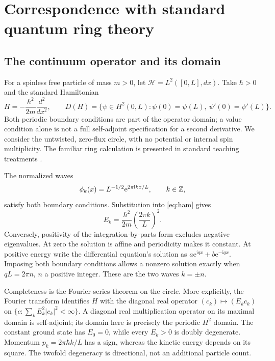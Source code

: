 \documentclass[11pt,a4paper]{article}
\theoremstyle{definition}\newtheorem{definition}[theorem]{Definition}
\theoremstyle{remark}\newtheorem{remark}[theorem]{Remark}
\newcommand{\ee}{\mathrm e}\newcommand{\ii}{\mathrm i}
\numberwithin{equation}{section}
\begin{document}
\section{Correspondence with standard quantum ring theory}\label{sec:quantum}
\subsection{The continuum operator and its domain}
For a spinless free particle of mass \(m>0\), let
\(\mathcal H=L^2([0,L],dx)\). Take \(\hbar>0\) and the standard Hamiltonian
\begin{equation}
 H=-\frac{\hbar^2}{2m}\frac{d^2}{dx^2},\qquad
 D(H)=\{\psi\in H^2(0,L):
 \psi(0)=\psi(L),\ \psi'(0)=\psi'(L)\}.
 \label{eq:ham}
\end{equation}
Both periodic boundary conditions are part of the operator domain;
a value condition alone is not a full self-adjoint specification for a
second derivative. We consider the untwisted, zero-flux circle, with no
potential or internal spin multiplicity. The familiar ring calculation is
presented in standard teaching treatments \cite{zwiebach,mitring}.

The normalized waves
\begin{equation}
 \phi_k(x)=L^{-1/2}\ee^{2\pi\ii kx/L},\qquad k\in\Z,
 \label{eq:plane}
\end{equation}
satisfy both boundary conditions. Substitution into \eqref{eq:ham} gives
\begin{equation}
 E_k=\frac{\hbar^2}{2m}\left(\frac{2\pi k}{L}\right)^2.
 \label{eq:energy}
\end{equation}
Conversely, positivity of the integration-by-parts form excludes negative
eigenvalues. At zero the solution is affine and periodicity makes it
constant. At positive energy write the differential equation's solution
as \(a\ee^{\ii qx}+b\ee^{-\ii qx}\). Imposing both boundary conditions
allows a nonzero solution exactly when \(qL=2\pi n\), \(n\) a positive
integer. These are the two waves \(k=\pm n\).

Completeness is the Fourier-series theorem on the circle. More explicitly,
the Fourier transform identifies \(H\) with the diagonal real operator
\((c_k)\mapsto(E_kc_k)\) on
\(\{c:\sum_k E_k^2|c_k|^2<\infty\}\).
A diagonal real multiplication operator on its maximal domain is
self-adjoint; its domain here is precisely the periodic \(H^2\) domain.
The constant ground state has \(E_0=0\), while every \(E_k>0\) is doubly
degenerate. Momentum \(p_k=2\pi\hbar k/L\) has a sign, whereas the kinetic
energy depends on its square. The twofold degeneracy is directional,
not an additional particle count.
\end{document}
